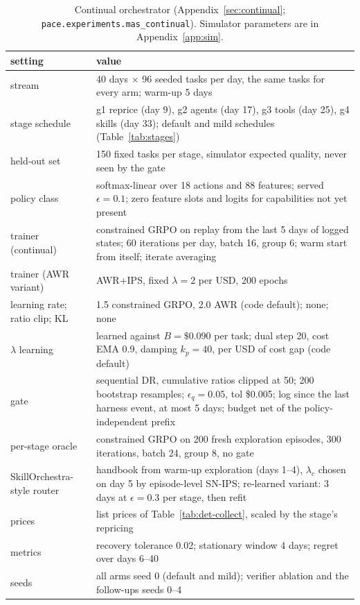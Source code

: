 \documentclass[10pt]{article}
\newcommand{\code}[1]{\texttt{#1}}
\begin{document}
\begin{table}[H]
\centering\footnotesize
\caption{Continual orchestrator (Appendix~\ref{sec:continual}; \code{pace.experiments.mas\_continual}). Simulator parameters are in Appendix~\ref{app:sim}.}
\label{tab:det-continual}
\begin{tabular}{p{4.0cm}p{11.6cm}}
\toprule
setting & value \\
\midrule
stream & 40 days $\times$ 96 seeded tasks per day, the same tasks for every arm; warm-up 5 days \\
stage schedule & g1 reprice (day 9), g2 agents (day 17), g3 tools (day 25), g4 skills (day 33); default and mild schedules (Table~\ref{tab:stages}) \\
held-out set & 150 fixed tasks per stage, simulator expected quality, never seen by the gate \\
policy class & softmax-linear over 18 actions and 88 features; served $\epsilon=0.1$; zero feature slots and logits for capabilities not yet present \\
trainer (continual) & constrained GRPO on replay from the last 5 days of logged states; 60 iterations per day, batch 16, group 6; warm start from itself; iterate averaging \\
trainer (AWR variant) & AWR+IPS, fixed $\lambda=2$ per USD, 200 epochs \\
learning rate; ratio clip; KL & 1.5 constrained GRPO, 2.0 AWR (code default); none; none \\
$\lambda$ learning & learned against $B=\$0.090$ per task; dual step 20, cost EMA 0.9, damping $k_p=40$, per USD of cost gap (code default) \\
gate & sequential DR, cumulative ratios clipped at 50; 200 bootstrap resamples; $\epsilon_q=0.05$, tol \$0.005; log since the last harness event, at most 5 days; budget net of the policy-independent prefix \\
per-stage oracle & constrained GRPO on 200 fresh exploration episodes, 300 iterations, batch 24, group 8, no gate \\
SkillOrchestra-style router & handbook from warm-up exploration (days 1--4), $\lambda_c$ chosen on day 5 by episode-level SN-IPS; re-learned variant: 3 days at $\epsilon=0.3$ per stage, then refit \\
prices & list prices of Table~\ref{tab:det-collect}, scaled by the stage's repricing \\
metrics & recovery tolerance 0.02; stationary window 4 days; regret over days 6--40 \\
seeds & all arms seed 0 (default and mild); verifier ablation and the follow-ups seeds 0--4 \\
\bottomrule
\end{tabular}
\end{table}
\end{document}
